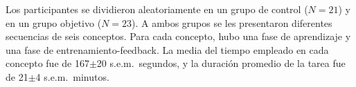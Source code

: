 
Los participantes se dividieron aleatoriamente en un grupo de control ($N=21$) y en un grupo objetivo ($N=23$). A ambos grupos se les presentaron diferentes secuencias de seis conceptos. Para cada concepto, hubo una fase de aprendizaje y una fase de entrenamiento-feedback. La media del tiempo empleado en cada concepto fue de 167$\pm$20 s.e.m.\ segundos, y la duración promedio de la tarea fue de 21$\pm$4 s.e.m.\ minutos. 



